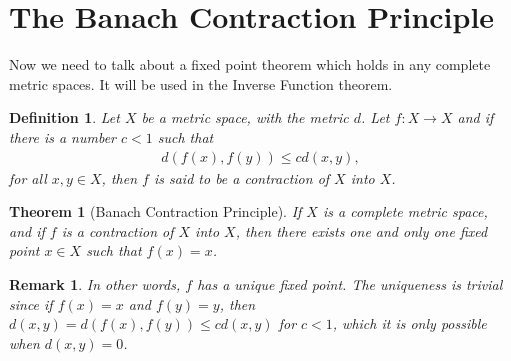\documentclass[11pt]{book}
\newtheorem{definition}{Definition}[chapter]
\newtheorem{theorem}{Theorem}[chapter]
\newtheorem{remark}{Remark}[chapter]
\theoremstyle{definition}
\numberwithin{equation}{chapter}
\begin{document}
\medskip




\section{The Banach Contraction Principle}

Now we need to talk about a fixed point theorem which holds in any complete metric spaces. It will be used in the Inverse Function theorem.

\medskip

\begin{definition}
Let $X$ be a metric space, with the metric $d$. Let $f: X \to X$ and if there is a number $c < 1$ such that 
\begin{align}\label{def_711_equ1}
    d(f(x),f(y)) \leq c d(x,y),
\end{align}
for all $x,y \in X$, then $f$ is said to be a contraction of $X$ into $X$. 
\end{definition}

\medskip

\begin{theorem}[Banach Contraction Principle]\label{th_710}
If $X$ is a complete metric space, and if $f$ is a contraction of $X$ into $X$, then there exists one and only one fixed point $x \in X$ such that $f(x) = x$.
\end{theorem}

\begin{remark}
In other words, $f$ has a unique fixed point. The uniqueness is trivial since if $f(x) = x$ and $f(y) = y$, then $d(x,y) = d(f(x),f(y)) \leq c d(x,y)$ for $c < 1$, which it is only possible when $d(x,y) = 0$.
\end{remark}
\end{document}
